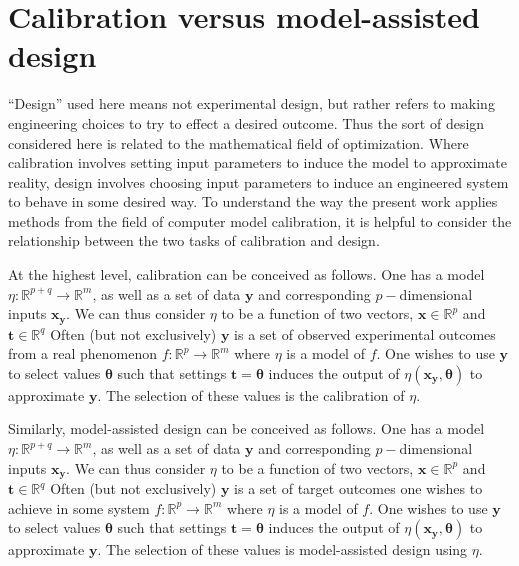 \documentclass[10pt,a4paper]{article}
\begin{document}

\section{Calibration versus model-assisted design}

``Design'' used here means not experimental design, but rather refers to making engineering choices to try to effect a desired outcome.
Thus the sort of design considered here is related to the mathematical field of optimization.
Where calibration involves setting input parameters to induce the model to approximate reality, design involves choosing input parameters to induce an engineered system to behave in some desired way.
To understand the way the present work applies methods from the field of computer model calibration, it is helpful to consider the relationship between the two tasks of calibration and design.

At the highest level, calibration can be conceived as follows.
One has a model $\eta: \mathbb{R}^{p+q} \to \mathbb{R}^m$, as well as a set of data $\mathbf{y}$ and corresponding $p-$dimensional inputs $\mathbf{x_y}$.
We can thus consider $\eta$ to be a function of two vectors, $\mathbf x\in\mathbb R^p$ and $\mathbf t\in\mathbb R^q$
Often (but not exclusively) $\mathbf y$ is a set of observed experimental outcomes from a real phenomenon $f:\mathbb{R}^p\to\mathbb{R}^m$ where $\eta$ is a model of $f$.
One wishes to use $\mathbf y$ to select values $\boldsymbol{\theta}$ such that settings $\mathbf t=\boldsymbol{\theta}$ induces the output of $\eta(\mathbf {x_y},\boldsymbol{\theta})$ to approximate $\mathbf y$.
The selection of these values is the calibration of $\eta$.

Similarly, model-assisted design can be conceived as follows.
One has a model $\eta: \mathbb{R}^{p+q} \to \mathbb{R}^m$, as well as a set of data $\mathbf{y}$ and corresponding $p-$dimensional inputs $\mathbf{x_y}$.
We can thus consider $\eta$ to be a function of two vectors, $\mathbf x\in\mathbb R^p$ and $\mathbf t\in\mathbb R^q$
Often (but not exclusively) $\mathbf y$ is a set of target outcomes one wishes to achieve in some system $f:\mathbb{R}^p\to\mathbb{R}^m$ where $\eta$ is a model of $f$.
One wishes to use $\mathbf y$ to select values $\boldsymbol{\theta}$ such that settings $\mathbf t=\boldsymbol{\theta}$ induces the output of $\eta(\mathbf {x_y},\boldsymbol{\theta})$ to approximate $\mathbf y$.
The selection of these values is model-assisted design using $\eta$.
\end{document}

